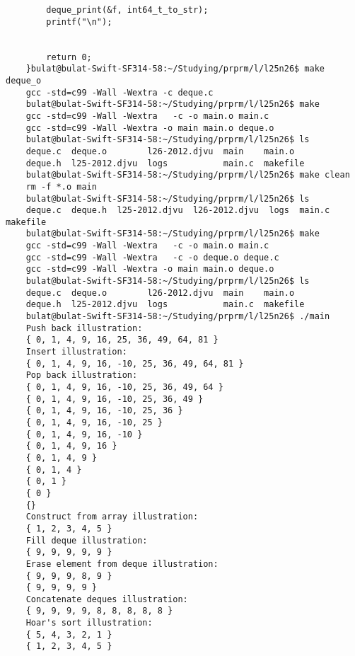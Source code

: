 \documentclass[a4paper]{article}
\newcounter{i}
\begin{document}
\begin{enumerate}[label=\textbf{\arabic*}.]
\begin{verbatim}
        deque_print(&f, int64_t_to_str);
        printf("\n");
    
    
        return 0;
    }bulat@bulat-Swift-SF314-58:~/Studying/prprm/l/l25n26$ make deque_o 
    gcc -std=c99 -Wall -Wextra -c deque.c
    bulat@bulat-Swift-SF314-58:~/Studying/prprm/l/l25n26$ make
    gcc -std=c99 -Wall -Wextra   -c -o main.o main.c
    gcc -std=c99 -Wall -Wextra -o main main.o deque.o
    bulat@bulat-Swift-SF314-58:~/Studying/prprm/l/l25n26$ ls
    deque.c  deque.o        l26-2012.djvu  main    main.o
    deque.h  l25-2012.djvu  logs           main.c  makefile
    bulat@bulat-Swift-SF314-58:~/Studying/prprm/l/l25n26$ make clean
    rm -f *.o main
    bulat@bulat-Swift-SF314-58:~/Studying/prprm/l/l25n26$ ls
    deque.c  deque.h  l25-2012.djvu  l26-2012.djvu  logs  main.c  makefile
    bulat@bulat-Swift-SF314-58:~/Studying/prprm/l/l25n26$ make
    gcc -std=c99 -Wall -Wextra   -c -o main.o main.c
    gcc -std=c99 -Wall -Wextra   -c -o deque.o deque.c
    gcc -std=c99 -Wall -Wextra -o main main.o deque.o
    bulat@bulat-Swift-SF314-58:~/Studying/prprm/l/l25n26$ ls
    deque.c  deque.o        l26-2012.djvu  main    main.o
    deque.h  l25-2012.djvu  logs           main.c  makefile
    bulat@bulat-Swift-SF314-58:~/Studying/prprm/l/l25n26$ ./main 
    Push back illustration:
    { 0, 1, 4, 9, 16, 25, 36, 49, 64, 81 }
    Insert illustration:
    { 0, 1, 4, 9, 16, -10, 25, 36, 49, 64, 81 }
    Pop back illustration:
    { 0, 1, 4, 9, 16, -10, 25, 36, 49, 64 }
    { 0, 1, 4, 9, 16, -10, 25, 36, 49 }
    { 0, 1, 4, 9, 16, -10, 25, 36 }
    { 0, 1, 4, 9, 16, -10, 25 }
    { 0, 1, 4, 9, 16, -10 }
    { 0, 1, 4, 9, 16 }
    { 0, 1, 4, 9 }
    { 0, 1, 4 }
    { 0, 1 }
    { 0 }
    {}
    Construct from array illustration:
    { 1, 2, 3, 4, 5 }
    Fill deque illustration:
    { 9, 9, 9, 9, 9 }
    Erase element from deque illustration:
    { 9, 9, 9, 8, 9 }
    { 9, 9, 9, 9 }
    Concatenate deques illustration:
    { 9, 9, 9, 9, 8, 8, 8, 8, 8 }
    Hoar's sort illustration:
    { 5, 4, 3, 2, 1 }
    { 1, 2, 3, 4, 5 }
    
\end{verbatim}

\large{}

\newpage


\end{enumerate}
\end{document}
